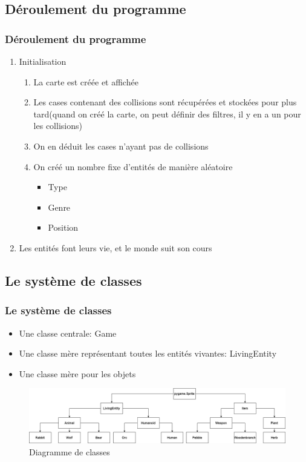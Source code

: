 \documentclass{beamer}
\begin{document}
\subsection{Déroulement du programme}

\begin{frame} \frametitle{Déroulement du programme}
	\begin{enumerate}
		\item Initialisation
			\begin{enumerate}
				\item La carte est créée et affichée
				\item Les cases contenant des collisions sont récupérées et stockées pour plus tard(quand on créé la carte, on peut définir des filtres, il y en a un pour les collisions)
				\item On en déduit les cases n'ayant pas de collisions
				\item On créé un nombre fixe d'entités de manière aléatoire
					\begin{itemize}
						\item Type
						\item Genre
						\item Position
					\end{itemize}
			\end{enumerate}
		\item Les entités font leurs vie, et le monde suit son cours
	\end{enumerate}
\end{frame}

\subsection{Le système de classes}

\begin{frame} \frametitle{Le système de classes}
	\begin{itemize}
		\item Une classe centrale: Game
		\item Une classe mère représentant toutes les entités vivantes: LivingEntity
		\item Une classe mère pour les objets
	\end{itemize}
	\begin{figure}
		\includegraphics[scale=0.24]{diagramme_class.png}
		\caption{Diagramme de classes}
		\label{Diagramme de classes}
	\end{figure}
\end{frame}
\end{document}
